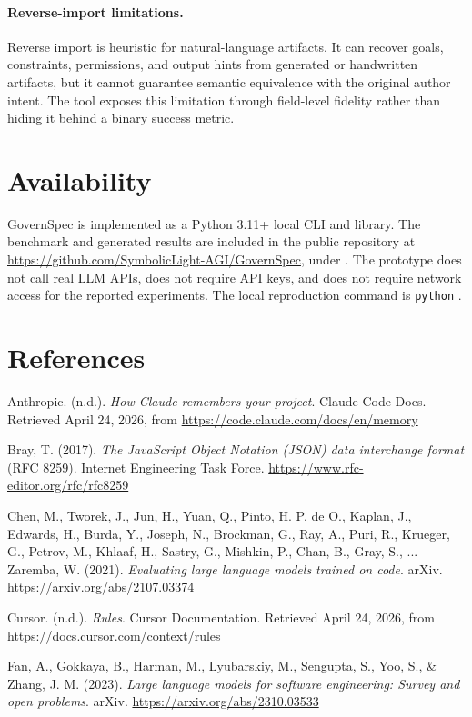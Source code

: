 \documentclass[11pt]{article}
\begin{document}
\paragraph{Reverse-import limitations.}
Reverse import is heuristic for natural-language artifacts. It can recover goals,
constraints, permissions, and output hints from generated or handwritten artifacts,
but it cannot guarantee semantic equivalence with the original author intent. The
tool exposes this limitation through field-level fidelity rather than hiding it
behind a binary success metric.

\section{Availability}

GovernSpec is implemented as a Python 3.11+ local CLI and library. The benchmark and
generated results are included in the public repository at
\url{https://github.com/SymbolicLight-AGI/GovernSpec}, under
. The prototype does not call real LLM APIs,
does not require API keys, and does not require network access for the reported
experiments. The local reproduction command is
\texttt{python} .

\section*{References}

Anthropic. (n.d.). \textit{How Claude remembers your project}. Claude Code Docs.
Retrieved April 24, 2026, from
\url{https://code.claude.com/docs/en/memory}

Bray, T. (2017). \textit{The JavaScript Object Notation (JSON) data interchange
format} (RFC 8259). Internet Engineering Task Force.
\url{https://www.rfc-editor.org/rfc/rfc8259}

Chen, M., Tworek, J., Jun, H., Yuan, Q., Pinto, H. P. de O., Kaplan, J.,
Edwards, H., Burda, Y., Joseph, N., Brockman, G., Ray, A., Puri, R.,
Krueger, G., Petrov, M., Khlaaf, H., Sastry, G., Mishkin, P., Chan, B.,
Gray, S., ... Zaremba, W. (2021). \textit{Evaluating large language models
trained on code}. arXiv. \url{https://arxiv.org/abs/2107.03374}

Cursor. (n.d.). \textit{Rules}. Cursor Documentation. Retrieved April 24, 2026,
from \url{https://docs.cursor.com/context/rules}

Fan, A., Gokkaya, B., Harman, M., Lyubarskiy, M., Sengupta, S., Yoo, S., \&
Zhang, J. M. (2023). \textit{Large language models for software engineering:
Survey and open problems}. arXiv. \url{https://arxiv.org/abs/2310.03533}
\end{document}
